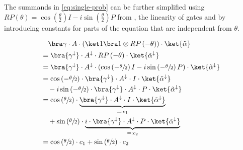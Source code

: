 The summands in \autoref{eq:single-prob} can be further simplified using
$RP\left(\theta\right) = \cos\left(\frac\theta2\right) I - i \sin\left(\frac\theta2\right) P$
from \cite{ostaszewski_structure_2021}, the linearity of gates and by
introducing constants for parts of the equation that are independent from
$\theta$.

\begin{equation}
    \label{eq:single-prob-simplification1}
    \begin{split}
            &\quad \bra\gamma \cdot A \cdot (\ket 1 \bra 1 \otimes RP\left(-\theta\right)) \cdot \ket{\tilde\alpha} \\
            &= \bra{\gamma^\downarrow} \cdot A^\downarrow \cdot RP\left(-\theta\right) \cdot \ket{\tilde\alpha^\downarrow} \\
            &= \bra{\gamma^\downarrow} \cdot A^\downarrow \cdot \left(\cos\left(-\sfrac\theta2\right) I - i \sin\left(-\sfrac\theta2\right) P\right) \cdot \ket{\tilde\alpha^\downarrow} \\
            &= \cos\left(-\sfrac\theta2\right) \cdot \bra{\gamma^\downarrow} \cdot A^\downarrow \cdot I \cdot \ket{\tilde\alpha^\downarrow} \\
                &\quad - i \sin\left(-\sfrac\theta2\right) \cdot \bra{\gamma^\downarrow} \cdot A^\downarrow \cdot P \cdot \ket{\tilde\alpha^\downarrow} \\
            &= \cos\left(\sfrac\theta2\right) \cdot \underbrace{\bra{\gamma^\downarrow} \cdot A^\downarrow \cdot I \cdot \ket{\tilde\alpha^\downarrow}}_{=: c_1} \\
                &\quad + \sin\left(\sfrac\theta2\right) \cdot \underbrace{i \cdot \bra{\gamma^\downarrow} \cdot A^\downarrow \cdot P \cdot \ket{\tilde\alpha^\downarrow}}_{=: c_2} \\
            &= \cos\left(\sfrac\theta2\right) \cdot c_1 + \sin\left(\sfrac\theta2\right) \cdot c_2
    \end{split}
\end{equation}

